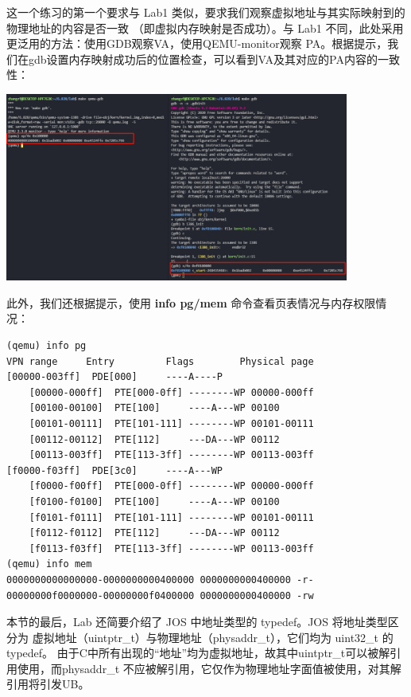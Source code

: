 \documentclass[12pt, letterpaper]{report}
\begin{document}
\quad \par
这一个练习的第一个要求与 Lab1 类似，要求我们观察虚拟地址与其实际映射到的物理地址的内容是否一致
（即虚拟内存映射是否成功）。与 Lab1 不同，此处采用更泛用的方法：使用GDB观察VA，使用QEMU-monitor观察
PA。根据提示，我们在gdb设置内存映射成功后的位置检查，可以看到VA及其对应的PA内容的一致性：\par 

\includegraphics[width=0.85\textwidth]{pa_va}

\quad \par 
此外，我们还根据提示，使用 \textbf{info pg/mem} 命令查看页表情况与内存权限情况：\par 
\quad \par 

\lstset{style=AssemblyStyle}
\setmainfont{Consolas}
\begin{lstlisting}
(qemu) info pg
VPN range     Entry         Flags        Physical page
[00000-003ff]  PDE[000]     ----A----P
    [00000-000ff]  PTE[000-0ff] --------WP 00000-000ff
    [00100-00100]  PTE[100]     ----A---WP 00100
    [00101-00111]  PTE[101-111] --------WP 00101-00111
    [00112-00112]  PTE[112]     ---DA---WP 00112
    [00113-003ff]  PTE[113-3ff] --------WP 00113-003ff
[f0000-f03ff]  PDE[3c0]     ----A---WP
    [f0000-f00ff]  PTE[000-0ff] --------WP 00000-000ff
    [f0100-f0100]  PTE[100]     ----A---WP 00100
    [f0101-f0111]  PTE[101-111] --------WP 00101-00111
    [f0112-f0112]  PTE[112]     ---DA---WP 00112
    [f0113-f03ff]  PTE[113-3ff] --------WP 00113-003ff
(qemu) info mem
0000000000000000-0000000000400000 0000000000400000 -r-
00000000f0000000-00000000f0400000 0000000000400000 -rw
\end{lstlisting}
\setmainfont{Times New Roman}
\quad \par

本节的最后，Lab 还简要介绍了 JOS 中地址类型的 typedef。JOS 将地址类型区分为
虚拟地址（uintptr\_t）与物理地址（physaddr\_t），它们均为 uint32\_t 的typedef。
由于C中所有出现的“地址”均为虚拟地址，故其中uintptr\_t可以被解引用使用，而physaddr\_t
不应被解引用，它仅作为物理地址字面值被使用，对其解引用将引发UB。\par 
\end{document}
